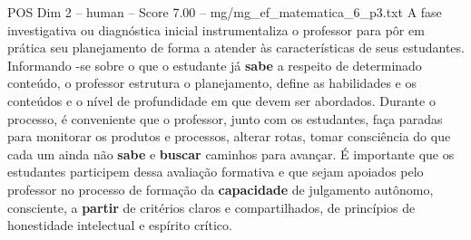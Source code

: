 \begin{textsample}{POS Dim 2 – human – Score 7.00 – mg/mg\_ef\_matematica\_6\_p3.txt}  \label{ex:f2_pos_008}
A fase investigativa ou diagnóstica inicial instrumentaliza o professor para pôr em prática seu planejamento de forma a atender às características de seus estudantes.
Informando -se sobre o que o estudante já \textbf{sabe} a respeito de determinado conteúdo, o professor estrutura o planejamento, define as habilidades e os conteúdos e o nível de profundidade em que devem ser abordados.
Durante o processo, é conveniente que o professor, junto com os estudantes, faça paradas para monitorar os produtos e processos, alterar rotas, tomar consciência do que cada um ainda não \textbf{sabe} e \textbf{buscar} caminhos para avançar. É importante que os estudantes participem dessa avaliação formativa e que sejam apoiados pelo professor no processo de formação da \textbf{capacidade} de julgamento autônomo, consciente, a \textbf{partir} de critérios claros e compartilhados, de princípios de honestidade intelectual e espírito crítico.

\end{textsample}
